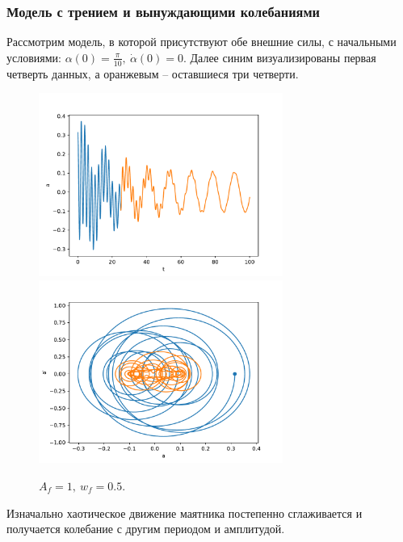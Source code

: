         \subsubsection{Модель с трением и вынуждающими колебаниями}
            Рассмотрим модель, в которой присутствуют обе внешние силы, с начальными условиями: $\alpha(0) = \frac{\pi}{10}, ~ \dot{\alpha}(0) = 0$. Далее синим визуализированы первая четверть данных, а оранжевым -- оставшиеся три четверти.
            \begin{figure}[H]
                \centering
                \includegraphics[width=8cm]{pictures/5resonance1.pdf}
                \includegraphics[width=8cm]{pictures/5resonance1p.pdf}
                \caption{$A_f = 1, ~ w_f = 0.5$.}
            \end{figure}
            Изначально хаотическое движение маятника постепенно сглаживается и получается колебание с другим периодом и амплитудой.

